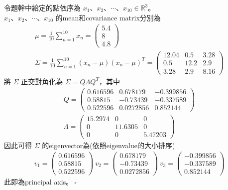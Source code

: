 \documentclass{article}
\begin{document}
\noindent
令題幹中給定的點依序為 $x_1$、$x_2$、$\cdots$、$x_{10} \in {\mathbb R}^3$。\\
$x_1$、$x_2$、$\cdots$、$x_{10}$ 的mean和covariance matrix分別為
\begin{gather*}
    \mu = \frac{1}{10} \sum_{n = 1}^{10} x_n = 
    \left(
    \begin{array}{c}
        5.4\\
        8\\
        4.8
    \end{array}
    \right)\\
    \Sigma = \frac{1}{10} \sum_{n = 1}^{10} (x_n - \mu)(x_n - \mu)^T = 
    \left(
    \begin{array}{ccc}
        12.04 & 0.5 & 3.28\\
        0.5 & 12.2 & 2.9\\
        3.28 & 2.9 & 8.16
    \end{array}
    \right)
\end{gather*}
將 $\Sigma$ 正交對角化為 $\Sigma = Q \Lambda Q^T$，其中
\begin{gather*}
    Q = 
    \left(
    \begin{array}{ccc}
        0.616596 & 0.678179 & -0.399856\\
        0.58815 & -0.73439 & -0.337589\\
        0.522596 & 0.0272856 & 0.852144
    \end{array}
    \right)\\
    \Lambda = 
    \left(
    \begin{array}{ccc}
        15.2974 & 0 & 0\\
        0 & 11.6305 & 0\\
        0 & 0 & 5.47203
    \end{array}
    \right)
\end{gather*}
因此可得 $\Sigma$ 的eigenvector為(依照eigenvalue的大小排序)
\begin{align*}
    v_1 = \left(
    \begin{array}{c}
        0.616596\\
        0.58815\\
        0.522596
    \end{array}
    \right)\ 
    v_2 = \left(
    \begin{array}{c}
        0.678179\\
        -0.73439\\
        0.0272856
    \end{array}
    \right)\ 
    v_3 = \left(
    \begin{array}{c}
        -0.399856\\
        -0.337589\\
        0.852144
    \end{array}
    \right)
\end{align*}
此即為principal axis。$\ \square$\\
\end{document}
